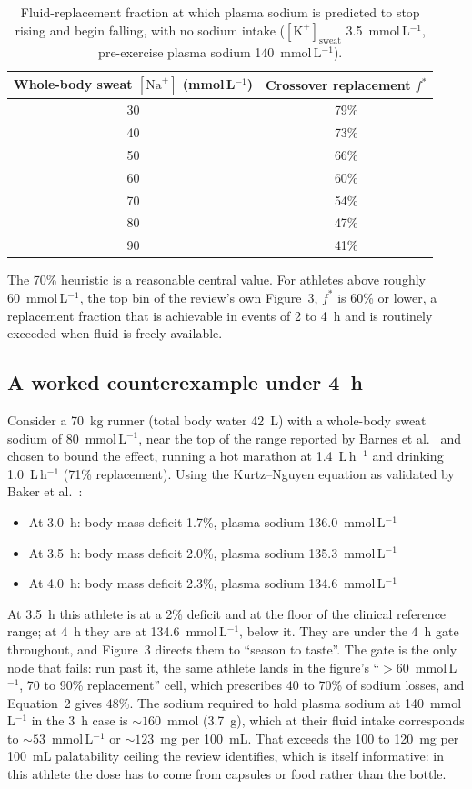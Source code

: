 \documentclass[11pt,a4paper]{article}
\newcommand{\Na}{[\mathrm{Na}^{+}]}
\newcommand{\K}{[\mathrm{K}^{+}]}
\newcommand{\mmolL}{mmol\,L$^{-1}$}
\newcommand{\Lh}{L\,h$^{-1}$}
\newcommand{\fstar}{f^{*}}
\begin{document}
\begin{table}[ht]
\centering
\caption{Fluid-replacement fraction at which plasma sodium is predicted to stop rising and begin falling, with no sodium intake ($\K_{\mathrm{sweat}}$ 3.5~\mmolL{}, pre-exercise plasma sodium 140~\mmolL{}).}
\label{tab:fstar}
\begin{tabular}{cc}
\toprule
Whole-body sweat $\Na$ (\mmolL) & Crossover replacement $\fstar$ \\
\midrule
30 & 79\% \\
40 & 73\% \\
50 & 66\% \\
60 & 60\% \\
70 & 54\% \\
80 & 47\% \\
90 & 41\% \\
\bottomrule
\end{tabular}
\end{table}

The 70\% heuristic is a reasonable central value. For athletes above roughly 60~\mmolL{}, the top bin of the review's own Figure~3, $\fstar$ is 60\% or lower, a replacement fraction that is achievable in events of 2 to 4~h and is routinely exceeded when fluid is freely available.

\subsection*{A worked counterexample under 4~h}

Consider a 70~kg runner (total body water 42~L) with a whole-body sweat sodium of 80~\mmolL{}, near the top of the range reported by Barnes et al.~\cite{barnes2019} and chosen to bound the effect, running a hot marathon at 1.4~\Lh{} and drinking 1.0~\Lh{} (71\% replacement). Using the Kurtz--Nguyen equation as validated by Baker et al.~\cite{baker2008}:
\begin{itemize}[nosep]
  \item At 3.0~h: body mass deficit 1.7\%, plasma sodium 136.0~\mmolL{}
  \item At 3.5~h: body mass deficit 2.0\%, plasma sodium 135.3~\mmolL{}
  \item At 4.0~h: body mass deficit 2.3\%, plasma sodium 134.6~\mmolL{}
\end{itemize}
At 3.5~h this athlete is at a 2\% deficit and at the floor of the clinical reference range; at 4~h they are at 134.6~\mmolL{}, below it. They are under the 4~h gate throughout, and Figure~3 directs them to ``season to taste''. The gate is the only node that fails: run past it, the same athlete lands in the figure's ``$>$60~\mmolL{}, 70 to 90\% replacement'' cell, which prescribes 40 to 70\% of sodium losses, and Equation~2 gives 48\%. The sodium required to hold plasma sodium at 140~\mmolL{} in the 3~h case is ${\sim}160$~mmol (3.7~g), which at their fluid intake corresponds to ${\sim}53$~\mmolL{} or ${\sim}123$~mg per 100~mL. That exceeds the 100 to 120~mg per 100~mL palatability ceiling the review identifies, which is itself informative: in this athlete the dose has to come from capsules or food rather than the bottle.
\end{document}
